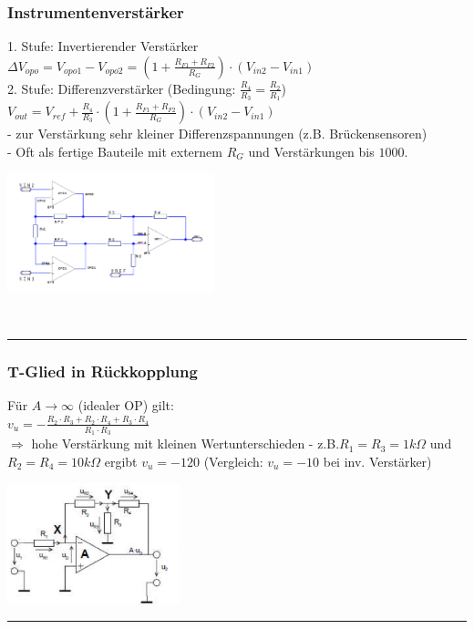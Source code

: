 		\begin{minipage}[c]{12cm}
		\subsubsection{Instrumentenverstärker}
			1. Stufe: Invertierender Verstärker \\
			$\Delta V_{opo}=V_{opo1}-V_{opo2}=(1+\frac{R_{F1}+R_{F2}}{R_G})\cdot(V_{in2}-V_{in1})$
			\smallskip \\
			2. Stufe: Differenzverstärker (Bedingung: $\frac{R_4}{R_3}=\frac{R_2}{R_1}$)\\
			$V_{out}=V_{ref}+\frac{R_4}{R_3}\cdot(1+\frac{R_{F1}+R_{F2}}{R_G})\cdot(V_{in2}-V_{in1})$
			\bigskip \\
			- zur Verstärkung sehr kleiner Differenzspannungen (z.B. Brückensensoren) \\
			- Oft als fertige Bauteile mit externem $R_G$ und Verstärkungen bis $1000$. \\
			\end{minipage}
			\begin{minipage}[c]{6cm}
          		\includegraphics[width=6cm]{./images/instramp.png} 
       	 	\end{minipage}\\
\hrule     
 	 
      	 \begin{minipage}[c]{12cm}	
       	 \subsubsection{T-Glied in Rückkopplung}
       	 	Für $A \to \infty$ (idealer OP) gilt: \smallskip \\
       	 	$v_u=-\frac{R_2 \cdot R_3 + R_2 \cdot R_4 + R_3 \cdot R_4}{R_1 \cdot R_3}$
       	 	\bigskip \\
       	 	$\Longrightarrow$ hohe Verstärkung mit kleinen Wertunterschieden - 
       	 	z.B.$R_1=R_3=1k\Omega$ und $R_2=R_4=10k\Omega$ ergibt $v_u=-120$ 
       	 	(Vergleich: $v_u=-10$ bei inv. Verstärker) \\
       	 \end{minipage}
       	 \begin{minipage}[c]{5cm}
       	 	\includegraphics[width=5cm]{./images/tglied.png}
       	 \end{minipage}
\hrule      
 	 

